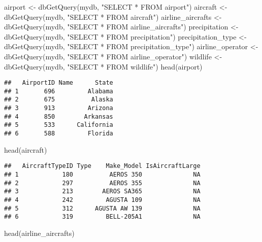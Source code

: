 \documentclass[
]{article}
\newenvironment{Shaded}{\begin{snugshade}}{\end{snugshade}}
\newcommand{\FunctionTok}[1]{\textcolor[rgb]{0.00,0.00,0.00}{#1}}
\newcommand{\NormalTok}[1]{#1}
\newcommand{\OtherTok}[1]{\textcolor[rgb]{0.56,0.35,0.01}{#1}}
\newcommand{\StringTok}[1]{\textcolor[rgb]{0.31,0.60,0.02}{#1}}
\begin{document}
\begin{Shaded}
\begin{Highlighting}[]
\NormalTok{airport }\OtherTok{\textless{}{-}} \FunctionTok{dbGetQuery}\NormalTok{(mydb, }\StringTok{"SELECT * FROM airport"}\NormalTok{)}
\NormalTok{aircraft }\OtherTok{\textless{}{-}} \FunctionTok{dbGetQuery}\NormalTok{(mydb, }\StringTok{"SELECT * FROM aircraft"}\NormalTok{)}
\NormalTok{airline\_aircrafts }\OtherTok{\textless{}{-}} \FunctionTok{dbGetQuery}\NormalTok{(mydb, }\StringTok{"SELECT * FROM airline\_aircrafts"}\NormalTok{)}
\NormalTok{precipitation }\OtherTok{\textless{}{-}} \FunctionTok{dbGetQuery}\NormalTok{(mydb, }\StringTok{"SELECT * FROM precipitation"}\NormalTok{)}
\NormalTok{precipitation\_type }\OtherTok{\textless{}{-}} \FunctionTok{dbGetQuery}\NormalTok{(mydb, }\StringTok{"SELECT * FROM precipitation\_type"}\NormalTok{)}
\NormalTok{airline\_operator }\OtherTok{\textless{}{-}} \FunctionTok{dbGetQuery}\NormalTok{(mydb, }\StringTok{"SELECT * FROM airline\_operator"}\NormalTok{)}
\NormalTok{wildlife }\OtherTok{\textless{}{-}} \FunctionTok{dbGetQuery}\NormalTok{(mydb, }\StringTok{"SELECT * FROM wildlife"}\NormalTok{)}
\FunctionTok{head}\NormalTok{(airport)}
\end{Highlighting}
\end{Shaded}

\begin{verbatim}
##   AirportID Name      State
## 1       696         Alabama
## 2       675          Alaska
## 3       913         Arizona
## 4       850        Arkansas
## 5       533      California
## 6       588         Florida
\end{verbatim}

\begin{Shaded}
\begin{Highlighting}[]
\FunctionTok{head}\NormalTok{(aircraft)}
\end{Highlighting}
\end{Shaded}

\begin{verbatim}
##   AircraftTypeID Type    Make_Model IsAircraftLarge
## 1            180          AEROS 350              NA
## 2            297          AEROS 355              NA
## 3            213        AEROS SA365              NA
## 4            242         AGUSTA 109              NA
## 5            312      AGUSTA AW 139              NA
## 6            319         BELL-205A1              NA
\end{verbatim}

\begin{Shaded}
\begin{Highlighting}[]
\FunctionTok{head}\NormalTok{(airline\_aircrafts)}
\end{Highlighting}
\end{Shaded}
\end{document}
